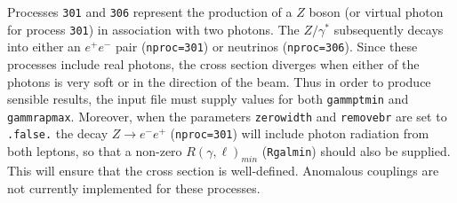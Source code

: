 
Processes {\tt{301}} and {\tt{306}} represent the production of a $Z$ boson
(or virtual photon for process {\tt 301}) in association with two photons.   The $Z/\gamma^*$ subsequently decays into
either an $e^+ e^-$ pair ({\tt nproc=301}) or neutrinos ({\tt nproc=306}).
Since these processes include real photons, the cross section diverges
when either of the photons is very soft or in the direction of the beam.
Thus in order to produce sensible results, the input file must supply values for both
{\tt gammptmin} and {\tt gammrapmax}. Moreover, when the parameters {\tt zerowidth}
and {\tt removebr} are set to {\tt .false.} the decay $Z \to e^- e^+$ ({\tt nproc=301})
will include photon radiation from both leptons, so that a non-zero $R(\gamma,\ell)_{min}$
({\tt Rgalmin})
should also be supplied. This will ensure that the cross section is well-defined.
Anomalous couplings are not currently implemented for these processes.
